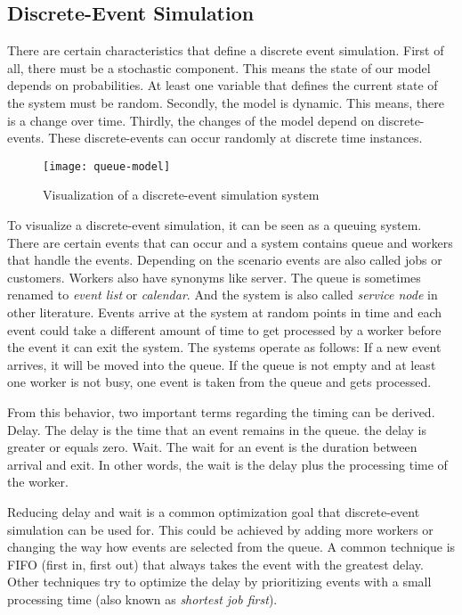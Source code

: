 \subsection{Discrete-Event Simulation}

There are certain characteristics that define a discrete event simulation.
First of all, there must be a stochastic component. This means the state of our model depends on probabilities. At least one variable that defines the current state of the system must be random.
Secondly, the model is dynamic. This means, there is a change over time.
Thirdly, the changes of the model depend on discrete-events. These discrete-events can occur randomly at discrete time instances.


\begin{figure}[h!]
 \caption{Visualization of a discrete-event simulation system}
 \texttt{[image: queue-model]}
\end{figure}

To visualize a discrete-event simulation, it can be seen as a queuing system. There are certain events that can occur and a system contains queue and workers that handle the events.
Depending on the scenario events are also called jobs or customers. Workers also have synonyms like server. The queue is sometimes renamed to \textit{event list} or \textit{calendar}. And the system is also called \textit{service node} in other literature.
Events arrive at the system at random points in time and each event could take a different amount of time to get processed by a worker before the event it can exit the system. The systems operate as follows: If a new event arrives, it will be moved into the queue. If the queue is not empty and at least one worker is not busy, one event is taken from the queue and gets processed.

From this behavior, two important terms regarding the timing can be derived.
Delay. The delay is the time that an event remains in the queue. the delay is greater or equals zero.
Wait. The wait for an event is the duration between arrival and exit. In other words, the wait is the delay plus the processing time of the worker.

Reducing delay and wait is a common optimization goal that discrete-event simulation can be used for. This could be achieved by adding more workers or changing the way how events are selected from the queue. A common technique is FIFO (first in, first out) that always takes the event with the greatest delay. Other techniques try to optimize the delay by prioritizing events with a small processing time (also known as \textit{shortest job first}).

